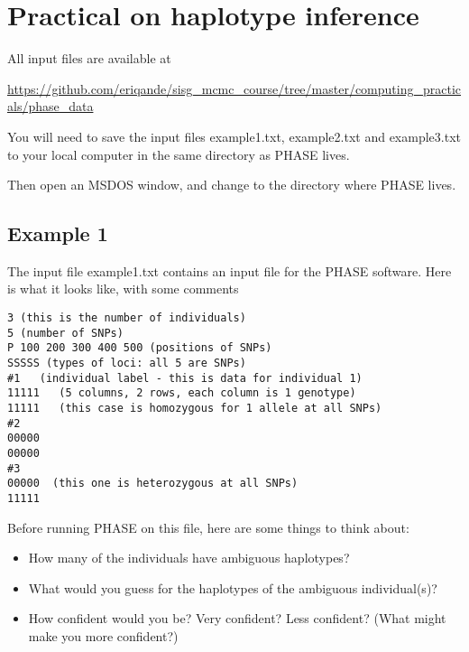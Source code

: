 
\section*{\hfil Practical on haplotype inference\hfil}

All input files are available at 

\url{https://github.com/eriqande/sisg_mcmc_course/tree/master/computing_practicals/phase_data}

You will need to save the input files example1.txt, example2.txt 
and example3.txt to your local computer in the same directory
as PHASE lives.

Then open an MSDOS window, and change to the directory where
PHASE lives.

\es\bs

\subsection*{Example 1}

The input file example1.txt contains an input file for the PHASE software.
Here is what it looks like, with some comments
\begin{verbatim}
3 (this is the number of individuals)
5 (number of SNPs)
P 100 200 300 400 500 (positions of SNPs) 
SSSSS (types of loci: all 5 are SNPs)
#1   (individual label - this is data for individual 1)
11111   (5 columns, 2 rows, each column is 1 genotype)
11111   (this case is homozygous for 1 allele at all SNPs)
#2
00000
00000
#3
00000  (this one is heterozygous at all SNPs)
11111
\end{verbatim}


\es\bs


Before running PHASE on this file, here are some things to think about:

\begin{itemize}
\item How many of the individuals have ambiguous haplotypes? 
\item What would you guess for the haplotypes of the ambiguous individual(s)?
\item How confident would you be? Very confident? Less confident? (What might
make you more confident?) 
\end{itemize}
\es\bs


